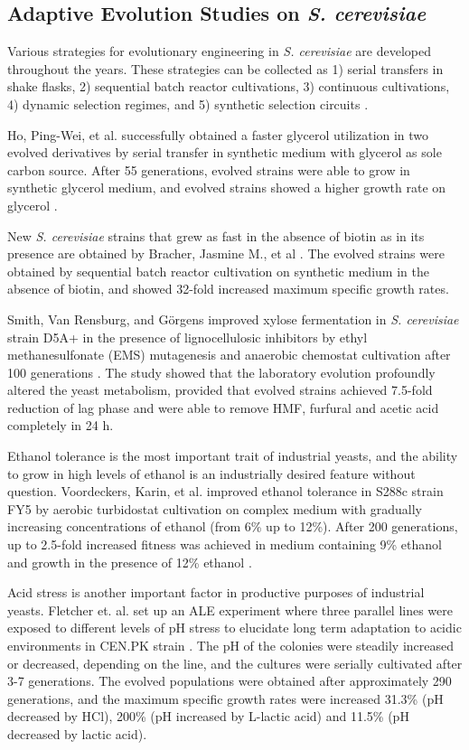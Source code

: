 \subsection{Adaptive Evolution Studies on \emph{S. cerevisiae}}

Various strategies for evolutionary engineering in \emph{S. cerevisiae} are developed throughout the years. These strategies can be collected as 1) serial transfers in shake flasks, 2) sequential batch reactor cultivations, 3) continuous cultivations, 4) dynamic selection regimes, and 5) synthetic selection circuits \cite{mans2018under}.

Ho, Ping-Wei, et al. successfully obtained a faster glycerol utilization in two evolved derivatives by serial transfer in synthetic medium with glycerol as sole carbon source. After 55 generations, evolved strains were able to grow in synthetic glycerol medium, and evolved strains showed a higher growth rate on glycerol \cite{ho2017sole}.

New \emph{S. cerevisiae} strains that grew as fast in the absence of biotin as in its presence are obtained by Bracher, Jasmine M., et al \cite{bracher2017laboratory}. The evolved strains were obtained by sequential batch reactor cultivation on synthetic medium in the absence of biotin, and showed 32-fold increased maximum specific growth rates.

Smith, Van Rensburg, and Görgens improved xylose fermentation in \emph{S. cerevisiae} strain D5A+ in the presence of lignocellulosic inhibitors by ethyl methanesulfonate (EMS) mutagenesis and anaerobic chemostat cultivation after 100  generations \cite{smith2014simultaneously}. The study showed that the laboratory evolution profoundly altered the yeast metabolism, provided that evolved strains achieved 7.5-fold reduction of lag phase and were able to remove HMF, furfural and acetic acid completely in 24 h.

Ethanol tolerance is the most important trait of industrial yeasts, and the ability to grow in high levels of ethanol is an industrially desired feature without question. Voordeckers, Karin, et al. improved ethanol tolerance in S288c strain FY5 by aerobic turbidostat cultivation on complex medium with gradually increasing concentrations of ethanol (from 6\% up to 12\%). After 200 generations, up to 2.5-fold increased fitness was achieved in medium containing 9\% ethanol and growth in the presence of 12\% ethanol \cite{voordeckers2015adaptation}.

Acid stress is another important factor in productive purposes of industrial yeasts. Fletcher et. al. set up an ALE experiment where three parallel lines were exposed to different levels of pH stress to elucidate long term adaptation to acidic environments in CEN.PK strain \cite{fletcher2017evolutionary}. The pH of the colonies were steadily increased or decreased, depending on the line, and the cultures were serially cultivated after 3-7 generations. The evolved populations were obtained after approximately 290 generations, and the maximum specific growth rates were increased 31.3\% (pH decreased by HCl), 200\% (pH increased by L-lactic acid) and 11.5\% (pH decreased by lactic acid).


